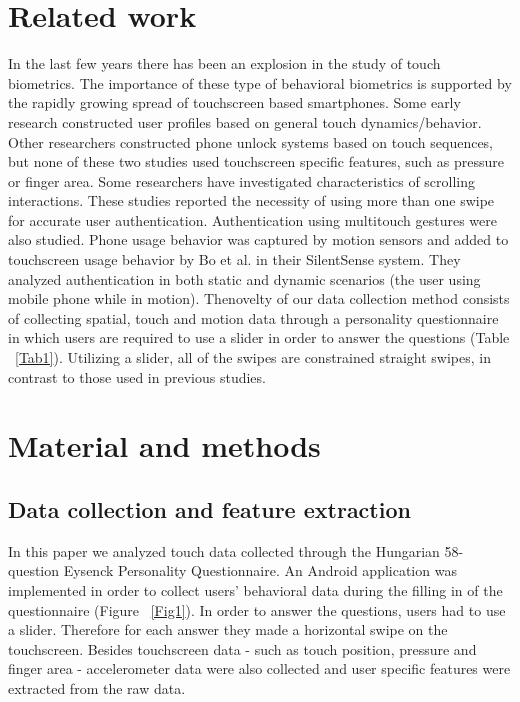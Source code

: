 \documentclass[referee]{raa}            %
\begin{document}

\section{Related work}
\label{sect:Rw}

In the last few years there has been an explosion in the study of touch biometrics. The importance of these type of behavioral biometrics is supported by the rapidly growing spread of touchscreen based smartphones. Some early research constructed user profiles based on general touch dynamics/behavior. Other researchers constructed phone unlock systems based on touch sequences, but none of these two studies used touchscreen specific features, such as pressure or finger area. Some researchers have investigated characteristics of scrolling interactions. These studies reported the necessity of using more than one swipe for accurate user authentication. Authentication using multitouch gestures were also studied. Phone usage behavior was captured by motion sensors and added to touchscreen usage behavior by Bo et al. in their SilentSense system. They analyzed authentication in both static and dynamic scenarios (the user using mobile phone while in motion). Thenovelty of our data collection method consists of collecting spatial, touch and motion data through a personality questionnaire in which users are required to use a slider in order to answer the questions (Table ~\eqref{Tab1}). Utilizing a slider, all of the swipes are constrained straight swipes, in contrast to those used in previous studies.

\section{Material and methods}
\label{sect:mat}

\subsection{Data collection and feature extraction}

In this paper we analyzed touch data collected through the Hungarian 58-question Eysenck Personality Questionnaire. An Android application was implemented in order to collect users’ behavioral data during the filling in of the questionnaire (Figure ~\eqref{Fig1}). In order to answer the questions, users had to use a slider. Therefore for each answer they made a horizontal swipe on the touchscreen. Besides touchscreen data - such as touch position, pressure and finger area - accelerometer data were also collected and user specific features were extracted from the raw data. 
\par
\end{document}
